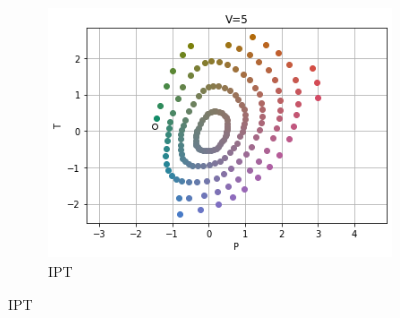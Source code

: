 \documentclass[12pt, a4paper, ngerman]{article}
\begin{document}
\begin{figure}
\begin{subfigure}[b]{0.3\linewidth}
    \includegraphics[width=\linewidth]{Grafiken/Vergleich_Munsell/ipt_munsell.png}
    \caption{IPT}
    \label{fig:munsell_ipt}
  \end{subfigure}
  

\end{figure}
\end{document}
